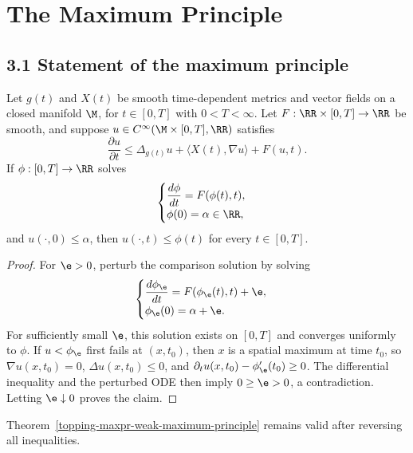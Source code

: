 \chapter{The Maximum Principle}

\section*{3.1 \quad Statement of the maximum principle}

\begin{theorem}
\label{topping-maxpr-weak-maximum-principle}
\leanok
Let $g(t)$ and $X(t)$ be smooth time-dependent metrics and vector fields on a
closed manifold $\M$, for $t\in[0,T]$ with $0<T<\infty$. Let
$F:\RR\times[0,T]\to\RR$ be smooth, and suppose
$u\in C^\infty(\M\times[0,T],\RR)$ satisfies
\[
\frac{\partial u}{\partial t}
\leq \Delta_{g(t)}u+\langle X(t),\nabla u\rangle+F(u,t).
\]
If $\phi:[0,T]\to\RR$ solves
\[
\begin{cases}
\dfrac{d\phi}{dt}=F(\phi(t),t),\\
\phi(0)=\alpha\in\RR,
\end{cases}
\]
and $u(\cdot,0)\leq\alpha$, then $u(\cdot,t)\leq\phi(t)$ for every
$t\in[0,T]$.
\end{theorem}

\begin{proof}
\sketch For $\e>0$, perturb the comparison solution by solving
\[
\begin{cases}
\dfrac{d\phi_\e}{dt}=F(\phi_\e(t),t)+\e,\\
\phi_\e(0)=\alpha+\e.
\end{cases}
\]
For sufficiently small $\e$, this solution exists on $[0,T]$ and converges
uniformly to $\phi$. If $u<\phi_\e$ first fails at $(x,t_0)$, then $x$ is a
spatial maximum at time $t_0$, so $\nabla u(x,t_0)=0$, $\Delta u(x,t_0)\leq0$,
and $\partial_tu(x,t_0)-\phi_\e'(t_0)\geq0$. The differential inequality and
the perturbed ODE then imply $0\geq\e>0$, a contradiction. Letting
$\e\downarrow0$ proves the claim.
\end{proof}

\begin{corollary}
\label{topping-maxpr-weak-minimum-principle}
\leanok
Theorem~\ref{topping-maxpr-weak-maximum-principle} remains valid after reversing all inequalities.
\end{corollary}

